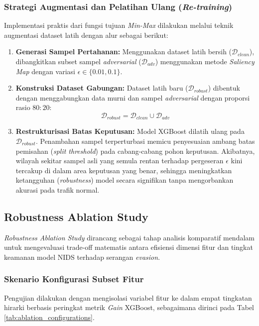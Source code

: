 \documentclass[11pt, a4paper]{article}
\begin{document}
\subsubsection{Strategi Augmentasi dan Pelatihan Ulang (\textit{Re-training})}
Implementasi praktis dari fungsi tujuan \textit{Min-Max} dilakukan melalui teknik augmentasi dataset latih dengan alur sebagai berikut:
\begin{enumerate}
    \item \textbf{Generasi Sampel Pertahanan:} Menggunakan dataset latih bersih ($\mathcal{D}_{clean}$), dibangkitkan subset sampel \textit{adversarial} ($\mathcal{D}_{adv}$) menggunakan metode \textit{Saliency Map} dengan variasi $\epsilon \in \{0.01, 0.1\}$.
    \item \textbf{Konstruksi Dataset Gabungan:} Dataset latih baru ($\mathcal{D}_{robust}$) dibentuk dengan menggabungkan data murni dan sampel \textit{adversarial} dengan proporsi rasio $80:20$:
    \begin{equation}
    \mathcal{D}_{robust} = \mathcal{D}_{clean} \cup \mathcal{D}_{adv}
    \end{equation}
    \item \textbf{Restrukturisasi Batas Keputusan:} Model XGBoost dilatih ulang pada $\mathcal{D}_{robust}$. Penambahan sampel terperturbasi memicu penyesuaian ambang batas pemisahan (\textit{split threshold}) pada cabang-cabang pohon keputusan. Akibatnya, wilayah sekitar sampel asli yang semula rentan terhadap pergeseran $\epsilon$ kini tercakup di dalam area keputusan yang benar, sehingga meningkatkan ketangguhan (\textit{robustness}) model secara signifikan tanpa mengorbankan akurasi pada trafik normal.
\end{enumerate}



\subsection{Robustness Ablation Study}
\textit{Robustness Ablation Study} dirancang sebagai tahap analisis komparatif mendalam untuk mengevaluasi trade-off matematis antara efisiensi dimensi fitur dan tingkat keamanan model NIDS terhadap serangan \textit{evasion}.

\subsubsection{Skenario Konfigurasi Subset Fitur}
Pengujian dilakukan dengan mengisolasi variabel fitur ke dalam empat tingkatan hirarki berbasis peringkat metrik \textit{Gain} XGBoost, sebagaimana dirinci pada Tabel \ref{tab:ablation_configurations}.
\end{document}

